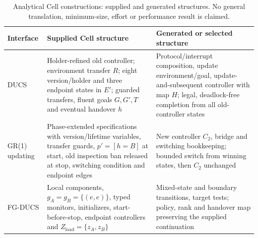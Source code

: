 \begin{table}[!htbp]
\centering\small
\caption{Analytical Cell constructions: supplied and generated structures. No general translation, minimum-size, effort or performance result is claimed.}
\label{tab:main-generation}\label{tab:contract-interfaces-full}
\begin{tabular}{@{}p{.16\linewidth}p{.42\linewidth}p{.36\linewidth}@{}}\toprule
Interface & Supplied Cell structure & Generated or selected structure\\\midrule
DUCS~\cite[Defs.~4.1--4.3, 5.1]{Nahabedian2020} & Holder-refined old controller; environment transfer $R$; eight version/holder and three endpoint states in $E'$; guarded transfers, fluent goals $G,G',T$ and eventual handover $h$ & Protocol/interrupt composition, update environment/goal, update-and-subsequent controller with map $H$; legal, deadlock-free completion from all old-controller states\\
GR(1) updating~\cite[Def.~3.1, Secs.~4--4.1]{Amram2022GR1DynamicUpdate} & Phase-extended specifications with version/lifetime variables, transfer guards, $p'=[h=B]$ at start, old inspection ban released at stop, switching condition and endpoint edges & New controller $C_2$, bridge and switching bookkeeping; bounded switch from winning states, then $C_2$ unchanged\\
FG-DUCS & Local components, $g_A=g_B=\{(e,e)\}$, typed monitors, initializers, start-before-stop, endpoint controllers and $Z_{\mathrm{load}}=\{z_A,z_B\}$ & Mixed-state and boundary transitions, target tests; policy, rank and handover map preserving the supplied continuation\\\bottomrule
\end{tabular}
\par{}
\end{table}
